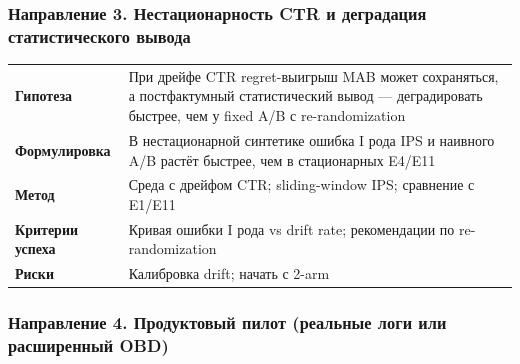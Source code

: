 \subsubsection{Направление 3. Нестационарность CTR и деградация статистического вывода}\label{ux43dux430ux43fux440ux430ux432ux43bux435ux43dux438ux435-3.-ux43dux435ux441ux442ux430ux446ux438ux43eux43dux430ux440ux43dux43eux441ux442ux44c-ctr-ux438-ux434ux435ux433ux440ux430ux434ux430ux446ux438ux44f-ux441ux442ux430ux442ux438ux441ux442ux438ux447ux435ux441ux43aux43eux433ux43e-ux432ux44bux432ux43eux434ux430}

\begingroup\footnotesize\setlength{\tabcolsep}{4pt}
\begin{xltabular}{\linewidth}{@{}
  >{\raggedright\arraybackslash}Y
  >{\raggedright\arraybackslash}Y@{}}
\toprule\noalign{}
\midrule\noalign{}
\endhead
\bottomrule\noalign{}
\endlastfoot
\textbf{Гипотеза} & При дрейфе CTR \cite{ref16,ref38} regret-выигрыш MAB может сохраняться, а постфактумный статистический вывод --- деградировать быстрее, чем у fixed A/B с re-randomization \\
\textbf{Формулировка} & В нестационарной синтетике ошибка I рода IPS и наивного A/B растёт быстрее, чем в стационарных E4/E11 \\
\textbf{Метод} & Среда с дрейфом CTR; sliding-window IPS; сравнение с E1/E11 \\
\textbf{Критерии успеха} & Кривая ошибки I рода vs drift rate; рекомендации по re-randomization \\
\textbf{Риски} & Калибровка drift; начать с 2-arm \\
\end{xltabular}
\endgroup

\subsubsection{Направление 4. Продуктовый пилот (реальные логи или расширенный OBD)}\label{ux43dux430ux43fux440ux430ux432ux43bux435ux43dux438ux435-4.-ux43fux440ux43eux434ux443ux43aux442ux43eux432ux44bux439-ux43fux438ux43bux43eux442-ux440ux435ux430ux43bux44cux43dux44bux435-ux43bux43eux433ux438-ux438ux43bux438-ux440ux430ux441ux448ux438ux440ux435ux43dux43dux44bux439-obd}

